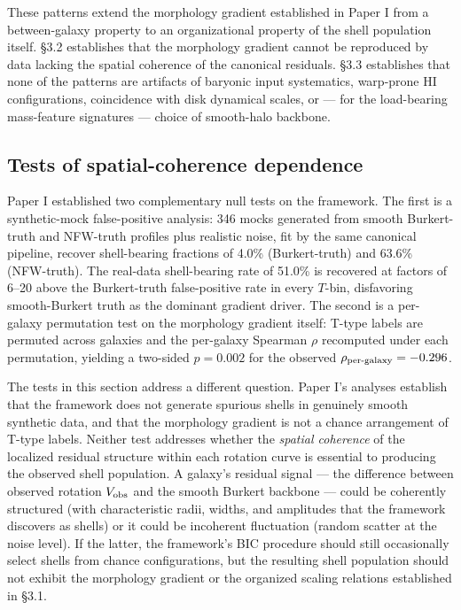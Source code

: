 \documentclass[linenumbers,trackchanges]{aastex701}
\begin{document}
These patterns extend the morphology gradient established in Paper I from a between-galaxy property to an organizational property of the shell population itself. \S3.2 establishes that the morphology gradient cannot be reproduced by data lacking the spatial coherence of the canonical residuals. \S3.3 establishes that none of the patterns are artifacts of baryonic input systematics, warp-prone HI configurations, coincidence with disk dynamical scales, or --- for the load-bearing mass-feature signatures --- choice of smooth-halo backbone.

\subsection{Tests of spatial-coherence dependence}

Paper I established two complementary null tests on the framework. The first is a synthetic-mock false-positive analysis: 346 mocks generated from smooth Burkert-truth and NFW-truth profiles plus realistic noise, fit by the same canonical pipeline, recover shell-bearing fractions of 4.0\% (Burkert-truth) and 63.6\% (NFW-truth). The real-data shell-bearing rate of 51.0\% is recovered at factors of 6--20 above the Burkert-truth false-positive rate in every $T$-bin, disfavoring smooth-Burkert truth as the dominant gradient driver. The second is a per-galaxy permutation test on the morphology gradient itself: T-type labels are permuted across galaxies and the per-galaxy Spearman $\rho$ recomputed under each permutation, yielding a two-sided $p = 0.002$ for the observed $\rho_{\rm per\text{-}galaxy} = -0.296$.

The tests in this section address a different question. Paper I's analyses establish that the framework does not generate spurious shells in genuinely smooth synthetic data, and that the morphology gradient is not a chance arrangement of T-type labels. Neither test addresses whether the \emph{spatial coherence} of the localized residual structure within each rotation curve is essential to producing the observed shell population. A galaxy's residual signal --- the difference between observed rotation $V_{\rm obs}$ and the smooth Burkert backbone --- could be coherently structured (with characteristic radii, widths, and amplitudes that the framework discovers as shells) or it could be incoherent fluctuation (random scatter at the noise level). If the latter, the framework's BIC procedure should still occasionally select shells from chance configurations, but the resulting shell population should not exhibit the morphology gradient or the organized scaling relations established in \S3.1.
\end{document}
